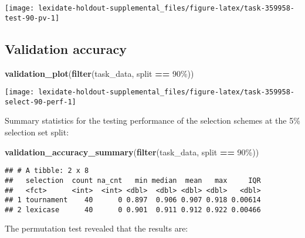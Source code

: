 \documentclass[
]{book}
\newenvironment{Shaded}{\begin{snugshade}}{\end{snugshade}}
\newcommand{\FunctionTok}[1]{\textcolor[rgb]{0.13,0.29,0.53}{\textbf{#1}}}
\newcommand{\NormalTok}[1]{#1}
\newcommand{\SpecialCharTok}[1]{\textcolor[rgb]{0.81,0.36,0.00}{\textbf{#1}}}
\newcommand{\StringTok}[1]{\textcolor[rgb]{0.31,0.60,0.02}{#1}}
\begin{document}
\texttt{[image: lexidate-holdout-supplemental\_files/figure-latex/task-359958-test-90-pv-1]}

\hypertarget{validation-accuracy-33}{%
\subsection{Validation accuracy}\label{validation-accuracy-33}}

\begin{Shaded}
\begin{Highlighting}[]
\FunctionTok{validation\_plot}\NormalTok{(}\FunctionTok{filter}\NormalTok{(task\_data, split }\SpecialCharTok{==} \StringTok{\textquotesingle{}90\%\textquotesingle{}}\NormalTok{))}
\end{Highlighting}
\end{Shaded}

\texttt{[image: lexidate-holdout-supplemental\_files/figure-latex/task-359958-select-90-perf-1]}

Summary statistics for the testing performance of the selection schemes at the 5\% selection set split:

\begin{Shaded}
\begin{Highlighting}[]
\FunctionTok{validation\_accuracy\_summary}\NormalTok{(}\FunctionTok{filter}\NormalTok{(task\_data, split }\SpecialCharTok{==} \StringTok{\textquotesingle{}90\%\textquotesingle{}}\NormalTok{))}
\end{Highlighting}
\end{Shaded}

\begin{verbatim}
## # A tibble: 2 x 8
##   selection  count na_cnt   min median  mean   max     IQR
##   <fct>      <int>  <int> <dbl>  <dbl> <dbl> <dbl>   <dbl>
## 1 tournament    40      0 0.897  0.906 0.907 0.918 0.00614
## 2 lexicase      40      0 0.901  0.911 0.912 0.922 0.00466
\end{verbatim}

The permutation test revealed that the results are:
\end{document}
